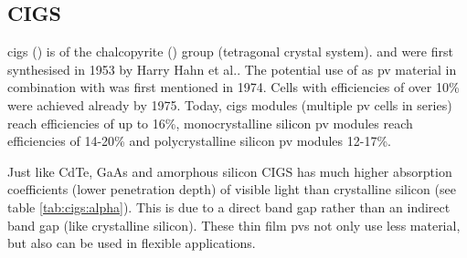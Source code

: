 \subsection{CIGS}
\gls{cigs} () is of the chalcopyrite () group (tetragonal crystal system). 
 and  were first synthesised in 1953 by Harry Hahn et al.\cite{hahn1953untersuchungen}.
The potential use of  as \gls{pv} material in combination with  was first mentioned in 1974\cite{wagner1974cuinse2}.
Cells with efficiencies of over 10\% were achieved already by 1975.\cite{kazmerski1976thin}
Today, 
\gls{cigs} modules (multiple \gls{pv} cells in series) 
reach efficiencies of up to 16\%\cite{feurer2017cigs},
monocrystalline silicon \gls{pv} modules reach efficiencies of 14-20\%
and polycrystalline silicon \gls{pv} modules 12-17\%\cite{mcevoy2011practical}.

Just like CdTe, GaAs and amorphous silicon CIGS has much higher absorption coefficients 
(lower penetration depth) of visible light than crystalline silicon (see table \ref{tab:cigs:alpha}). 
This is due to a direct band gap rather than an indirect band gap (like crystalline silicon). 
These thin film \gls{pv}s not only use less material, but also can be used in flexible applications. 

